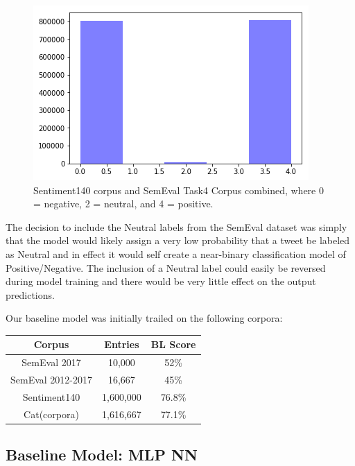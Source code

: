 \documentclass[11pt]{article}
\begin{document}
\begin{figure}
  \includegraphics[width=\linewidth]{sentiment140.png}
  \caption{Sentiment140 corpus and SemEval Task4 Corpus combined, where 0 = negative, 
  2 = neutral, and 4 = positive.}
  \label{fig:Sentiment140_corpus}
\end{figure}

The decision to include the Neutral labels from the SemEval dataset was simply that the model would 
likely assign a very low probability that a tweet be labeled as Neutral and in effect it would self 
create a near-binary classification model of Positive/Negative. The inclusion of a Neutral label could easily be reversed during model training and there would be very little effect on the output predictions. 


Our baseline model was initially trailed on the following corpora: 

\begin{center}
 \begin{tabular}{||c c c||} 
 \hline
 Corpus & Entries & BL Score \\ [0.5ex] 
 \hline\hline
 SemEval 2017 & 10,000 & 52\%  \\ 
 \hline
 SemEval 2012-2017 & 16,667 & 45\%  \\
 \hline
 Sentiment140 & 1,600,000 & 76.8\%  \\
 \hline
 Cat(corpora) & 1,616,667 & 77.1\% \\[1ex] 
 \hline
\end{tabular}
\end{center}


\subsection{Baseline Model: MLP NN}
\end{document}
